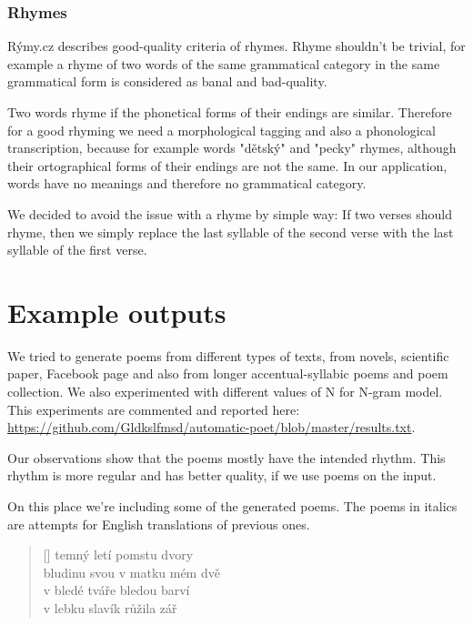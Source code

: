 \documentclass[a4]{article}
\begin{document}
\subsubsection{Rhymes}


Rýmy.cz\cite{rymy} describes good-quality criteria of rhymes. Rhyme
shouldn't be trivial, for example a rhyme of two words of the same
grammatical category in the same grammatical form is considered as banal
and bad-quality.

Two words rhyme if the phonetical forms of their endings are similar. 
Therefore for a good rhyming we need a morphological tagging and
also a phonological transcription, because for example words "dětský" and
"pecky" rhymes, although their ortographical forms of their endings are not
the same. In our application, words have no meanings and
therefore no grammatical category.

We decided to avoid the issue with a rhyme by simple way:
If two verses should rhyme, then we simply replace the last syllable of the
second verse with the last syllable of the first verse.

\section{Example outputs}

We tried to generate poems from different types of texts, from novels,
scientific paper, Facebook page and also from longer accentual-syllabic
poems and poem collection. We also experimented with different values of
N for N-gram model. This experiments are commented and reported here: 
\url{https://github.com/Gldkslfmsd/automatic-poet/blob/master/results.txt}.

Our observations show that the poems mostly have the intended rhythm. This
rhythm is more regular and has better quality, if we use poems on the
input. 

On this place we're including some of the generated poems. The poems
in italics are attempts for English translations of previous ones.




\settowidth{\versewidth}{Than Tycho Brahe, or Erra Pater:}
\begin{verse}[\versewidth]
temný  letí  pomstu  dvory \\
bludinu  svou  v matku  mém  dvě \\
v bledé  tváře  bledou  barví \\
v lebku  slavík  růžila  zář  \\
\end{verse}
\end{document}
